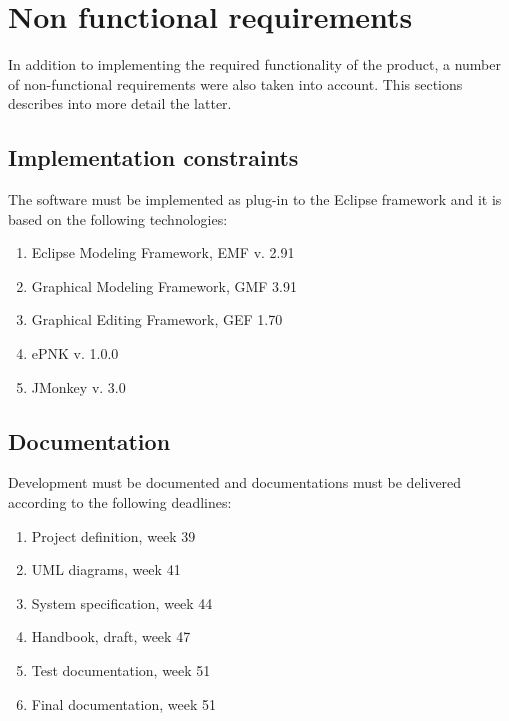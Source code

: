 \section{Non functional requirements}
\label{sec:non-functional}

In addition to implementing the required functionality of the product, a number of non-functional requirements were also taken into account. This sections describes into more detail the latter.

\subsection{Implementation constraints}
The software must be implemented as plug-in to the Eclipse framework and it is based on the following technologies:
\begin{enumerate}
	\item Eclipse Modeling Framework, EMF v. 2.91
	\item Graphical Modeling Framework, GMF 3.91
	\item Graphical Editing Framework, GEF 1.70
	\item ePNK v. 1.0.0
	\item JMonkey v. 3.0
\end{enumerate}

\subsection{Documentation}
Development must be documented and documentations must be delivered according to the following deadlines:
\begin{enumerate}
	\item Project definition, week 39
	\item UML diagrams, week 41
	\item System specification, week 44
	\item Handbook, draft, week 47
	\item Test documentation, week 51
	\item Final documentation, week 51
\end{enumerate}

